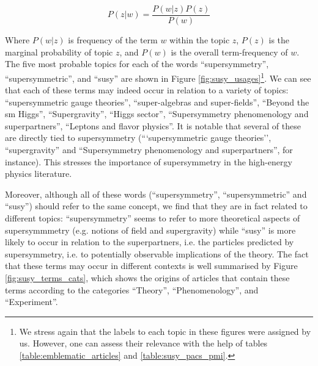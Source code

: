 \documentclass[smallextended]{svjour3}
\begin{document}
\begin{equation}
    P(z|w) = \dfrac{P(w|z)P(z)}{P(w)}
\end{equation}

Where $P(w|z)$ is frequency of the term $w$ within the topic $z$, $P(z)$ is the marginal probability of topic $z$, and $P(w)$ is the overall term-frequency of $w$. The five most probable topics for each of the words ``supersymmetry'', ``supersymmetric'', and ``susy''  are shown in Figure \ref{fig:susy_usages}\footnote{We stress again that the labels to each topic in these figures were assigned by us. However, one can assess their relevance with the help of tables \ref{table:emblematic_articles} and \ref{table:susy_pacs_pmi}.}. We can see that each of these terms may indeed occur in relation to a variety of topics: ``supersymmetric gauge theories'', ``super-algebras and  super-fields'', ``Beyond the \gls{sm} Higgs'', ``Supergravity'', ``Higgs sector'', ``Supersymmetry phenomenology and superpartners'', ``Leptons and flavor physics''. It is notable that several of these are directly tied to supersymmetry (```supersymmetric gauge theories'', ``supergravity'' and ``Supersymmetry phenomenology and superpartners'', for instance). This stresses the importance of supersymmetry in the high-energy physics literature.

Moreover, although all of these words (``supersymmetry'', ``supersymmetric'' and ``susy'') should refer to the same concept, we find that they are in fact related to different topics: ``supersymmetry'' seems to refer to more theoretical aspects of supersymmmetry (e.g. notions of field and supergravity) while ``susy'' is more likely to occur in relation to the superpartners, i.e. the particles predicted by supersymmetry, i.e. to potentially observable implications of the theory. The fact that these terms may occur in different contexts is well summarised by Figure \ref{fig:susy_terms_cats}, which shows the origins of articles that contain these terms according to the categories ``Theory'', ``Phenomenology'', and ``Experiment''.
\begin{figure*}
    \centering
    
    \caption{\textbf{The many uses of supersymmetry}. For three terms $w$ refering to supersymmetry (``supersymmetric'', ``supersymmetry'', and ``susy''), the five topics $z$ that are most likely to have led to their occurrence and their respective conditional probability $P(z|w)$ are shown. ``supersymetry'' and ``supersymmetric'' have similar distributions, and mostly occur within theoretical topics. ``susy'''s topic distribution is much more peaked, and most often occurs within phenomenological topics.}
    \label{fig:susy_usages}
\end{figure*}
\end{document}
